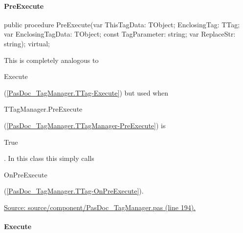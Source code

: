 \documentclass{report}
\newif\ifpdf
\begin{document}
\paragraph*{PreExecute}\hspace*{\fill}

\label{PasDoc_TagManager.TTag-PreExecute}
\begin{list}{}{
\setlength{\itemindent}{0cm}
\setlength{\listparindent}{0cm}
\setlength{\leftmargin}{\evensidemargin}
\addtolength{\leftmargin}{\tmplength}
\settowidth{\labelsep}{X}
\addtolength{\leftmargin}{\labelsep}
\setlength{\labelwidth}{\tmplength}
}
\item[\textbf{Declaration}\hfill]
\ifpdf
\begin{flushleft}
\fi
\begin{ttfamily}
public procedure PreExecute(var ThisTagData: TObject; EnclosingTag: TTag; var EnclosingTagData: TObject; const TagParameter: string; var ReplaceStr: string); virtual;\end{ttfamily}

\ifpdf
\end{flushleft}
\fi

\par
\item[\textbf{Description}]
This is completely analogous to \begin{ttfamily}Execute\end{ttfamily}(\ref{PasDoc_TagManager.TTag-Execute}) but used when \begin{ttfamily}TTagManager.PreExecute\end{ttfamily}(\ref{PasDoc_TagManager.TTagManager-PreExecute}) is \begin{ttfamily}True\end{ttfamily}. In this class this simply calls \begin{ttfamily}OnPreExecute\end{ttfamily}(\ref{PasDoc_TagManager.TTag-OnPreExecute}).\par
\href{https://github.com/pasdoc/pasdoc/blob/master/source/component/PasDoc_TagManager.pas#L194}{Source: source/component/PasDoc{\_}TagManager.pas (line 194).}

\end{list}
\paragraph*{Execute}\hspace*{\fill}
\end{document}

